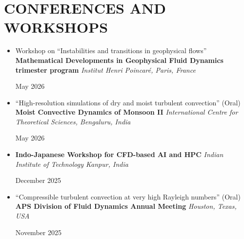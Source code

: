 \documentclass[10pt,a4paper]{article}
\begin{document}
\section{CONFERENCES AND WORKSHOPS}
\begin{itemize}[leftmargin=1.5em, itemsep=6pt, parsep=0pt]
  \item \begin{minipage}[t]{0.80\linewidth}
          Workshop on ``Instabilities and transitions in geophysical flows'' \newline
          \textbf{Mathematical Developments in Geophysical Fluid Dynamics trimester program} \newline
          \textit{Institut Henri Poincaré, Paris, France}
        \end{minipage}%
        \begin{minipage}[t]{0.20\linewidth}
          \raggedleft
          May 2026
        \end{minipage}

  \item \begin{minipage}[t]{0.80\linewidth}
          ``High-resolution simulations of dry and moist turbulent convection'' (Oral) \newline
          \textbf{Moist Convective Dynamics of Monsoon II} \newline
          \textit{International Centre for Theoretical Sciences, Bengaluru, India}
        \end{minipage}%
        \begin{minipage}[t]{0.20\linewidth}
          \raggedleft
          May 2026
        \end{minipage}

  \item \begin{minipage}[t]{0.80\linewidth}
          \textbf{Indo-Japanese Workshop for CFD-based AI and HPC} \newline
          \textit{Indian Institute of Technology Kanpur, India}
        \end{minipage}%
        \begin{minipage}[t]{0.20\linewidth}
          \raggedleft
          December 2025
        \end{minipage}

  \item \begin{minipage}[t]{0.80\linewidth}
          ``Compressible turbulent convection at very high Rayleigh numbers'' (Oral) \newline
          \textbf{APS Division of Fluid Dynamics Annual Meeting} \newline
          \textit{Houston, Texas, USA}
        \end{minipage}%
        \begin{minipage}[t]{0.20\linewidth}
          \raggedleft
          November 2025
        \end{minipage}


\end{itemize}
\end{document}
